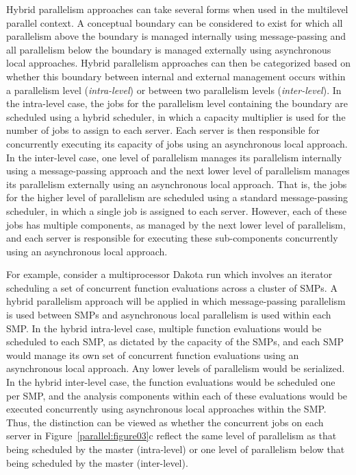 Hybrid parallelism approaches can take several forms when used in the
multilevel parallel context. A conceptual boundary can be considered
to exist for which all parallelism above the boundary is managed
internally using message-passing and all parallelism below the
boundary is managed externally using asynchronous local approaches.
Hybrid parallelism approaches can then be categorized based on whether
this boundary between internal and external management occurs within a
parallelism level (\emph{intra-level}) or between two parallelism
levels (\emph{inter-level}). In the intra-level case, the jobs for the
parallelism level containing the boundary are scheduled using a hybrid
scheduler, in which a capacity multiplier is used for the number of
jobs to assign to each server. Each server is then responsible for
concurrently executing its capacity of jobs using an asynchronous
local approach. In the inter-level case, one level of parallelism
manages its parallelism internally using a message-passing approach
and the next lower level of parallelism manages its parallelism
externally using an asynchronous local approach. That is, the jobs for
the higher level of parallelism are scheduled using a standard
message-passing scheduler, in which a single job is assigned to each
server. However, each of these jobs has multiple components, as
managed by the next lower level of parallelism, and each server is
responsible for executing these sub-components concurrently using an
asynchronous local approach.

For example, consider a multiprocessor Dakota run which involves an
iterator scheduling a set of concurrent function evaluations across a
cluster of SMPs. A hybrid parallelism approach will be applied in
which message-passing parallelism is used between SMPs and
asynchronous local parallelism is used within each SMP. In the hybrid
intra-level case, multiple function evaluations would be scheduled to
each SMP, as dictated by the capacity of the SMPs, and each SMP would
manage its own set of concurrent function evaluations using an
asynchronous local approach. Any lower levels of parallelism would be
serialized. In the hybrid inter-level case, the function evaluations
would be scheduled one per SMP, and the analysis components within
each of these evaluations would be executed concurrently using
asynchronous local approaches within the SMP. Thus, the distinction
can be viewed as whether the concurrent jobs on each server in
Figure~\ref{parallel:figure03}c reflect the same level of parallelism
as that being scheduled by the master (intra-level) or one level of
parallelism below that being scheduled by the master (inter-level).


